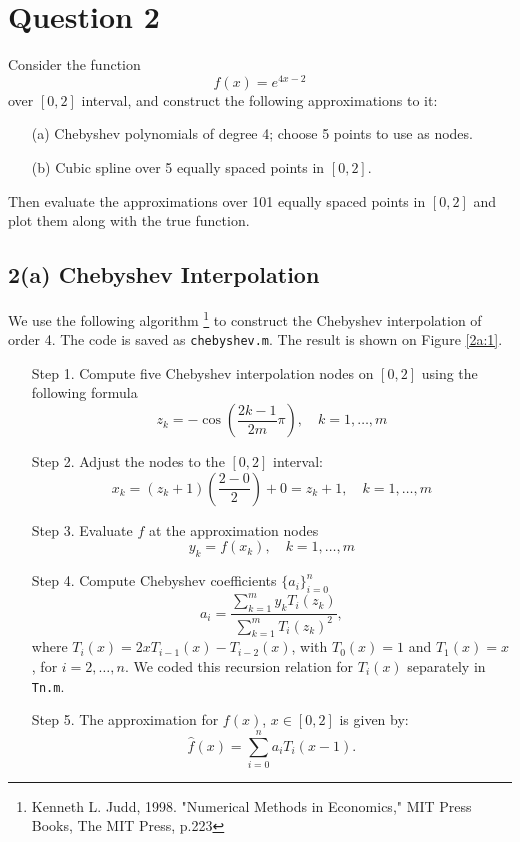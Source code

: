 \documentclass[11pt]{article}
\newcommand{\1}{\mathbbm{1}}
\newcounter{daggerfootnote}
\newcommand*{\daggerfootnote}[1]{%
	\setcounter{daggerfootnote}{\value{footnote}}%
	\renewcommand*{\thefootnote}{\fnsymbol{footnote}}%
	\footnote[2]{#1}%
	\setcounter{footnote}{\value{daggerfootnote}}%
	\renewcommand*{\thefootnote}{\arabic{footnote}}%
}
\begin{document}
\section*{Question 2}
Consider the function 
\[f (x ) = e^{4x-2} \]
over $[0,2]$ interval, and construct the following approximations
to it:
\begin{enumerate}
	\item[(a)] Chebyshev polynomials of degree 4; choose 5 points to use as nodes.
	\item[(b)] Cubic spline over 5 equally spaced points in $[0,2]$.
\end{enumerate}
Then evaluate the approximations over 101 equally spaced points in $[0,2]$ and plot them along with the true function. 

\subsection*{2(a) Chebyshev Interpolation}
We use the following algorithm\daggerfootnote{Kenneth L. Judd, 1998. "Numerical Methods in Economics," MIT Press Books, The MIT Press, p.223} to construct the Chebyshev interpolation of order 4. The code is saved as \texttt{chebyshev.m}. The result is shown on Figure \ref{2a:1}.
\begin{enumerate}
	\item [Step 1.] Compute five Chebyshev interpolation nodes on $[0,2]$ using the following formula
	\[z_k = -\cos\left(\frac{2k-1}{2m}\pi\right), \quad k=1,\ldots,m\]
	\item[Step 2.] Adjust the nodes to the $[0,2]$ interval:
	\[x_k=(z_k+1)\left(\frac{2-0}{2}\right)+0=z_k+1,\quad k=1,\ldots,m\]
	\item[Step 3.] Evaluate $f$ at the approximation nodes
	\[y_k=f(x_k), \quad k=1,\ldots,m\]
	\item[Step 4.] Compute Chebyshev coefficients $\{a_i\}_{i=0}^n$
	\[a_i=\frac{\sum_{k=1}^my_kT_i(z_k)}{\sum_{k=1}^mT_i(z_k)^2},\]
	where $T_i(x)=2xT_{i-1}(x)-T_{i-2}(x)$, with $T_0(x)=1$ and $T_1(x)=x$, for $i=2,\ldots,n$. We coded this recursion relation for $T_i(x)$ separately in \texttt{Tn.m}.
	\item[Step 5.] The approximation for $f(x)$, $x\in[0,2]$ is given by:
	\[\hat{f}(x)=\sum_{i=0}^n a_iT_i\left(x-1\right).\]
\end{enumerate}
\end{document}
